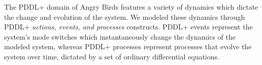 \documentclass[letterpaper]{article} %
\begin{document}
The PDDL+ domain of Angry Birds features a variety of dynamics which dictate the change and evolution of the system. 
We modeled these dynamics through PDDL+ \emph{actions, events, and processes} constructs.  
PDDL+ events represent the system's mode switches which instantaneously change the dynamics of the modeled system, whereas PDDL+ processes represent processes that evolve the system over time, dictated by a set of ordinary differential equations.



\end{document}
